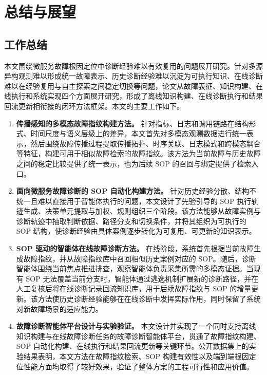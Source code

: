 
\chapter{总结与展望}

\section{工作总结}

本文围绕微服务故障根因定位中诊断经验难以有效复用的问题展开研究。针对多源异构观测难以形成统一故障表示、历史诊断经验难以沉淀为可执行知识、在线诊断难以在经验复用与自主探索之间稳定切换等问题，论文从故障表征、知识构建、在线执行和系统实现四个方面展开研究，形成了离线知识构建、在线诊断执行和结果回流更新相衔接的闭环方法框架。本文的主要工作如下。

\begin{enumerate}[label=（\arabic*）]
    \item \textbf{传播感知的多模态故障指纹构建方法。}
    针对指标、日志和调用链路在结构形式、时间尺度与语义层级上的差异，本文首先对多模态观测数据进行统一表示，然后围绕故障传播过程提取传播拓扑、时序关联、日志模式和跨模态耦合等特征，构建可用于相似故障检索的故障指纹。该方法为当前故障与历史故障之间的稳定比较提供了统一表示，也为后续 SOP 的召回与绑定提供了检索入口。

    \item \textbf{面向微服务故障诊断的 SOP 自动化构建方法。}
    针对历史经验分散、结构不统一且难以直接用于智能体执行的问题，本文设计了先验引导的 SOP 执行轨迹生成、决策单元提取与加权、规则组织三个阶段。该方法能够从故障实例与诊断轨迹中抽取判断依据、路径分支和切换条件，并将其组织为可执行的 SOP 结构，使诊断经验由具体案例逐步转化为可复用、可更新的知识表示。

    \item \textbf{SOP 驱动的智能体在线故障诊断方法。}
    在线阶段，系统首先根据当前故障生成故障指纹，并从故障指纹库中召回相似历史案例对应的 SOP。随后，诊断智能体围绕当前焦点推进排查，观察智能体负责采集所需的多模态证据。当现有 SOP 无法覆盖当前分支时，智能体通过逃逸机制扩展新的诊断路径，并在人工复核后将在线诊断记录回流知识库，用于后续故障指纹与 SOP 的增量更新。该方法使历史诊断经验能够在在线诊断中发挥实际作用，同时保留了系统对新故障场景的适应能力。

    \item \textbf{故障诊断智能体平台设计与实验验证。}
    本文设计并实现了一个同时支持离线知识构建与在线故障诊断任务的故障诊断智能体平台，贯通了故障指纹构建、SOP 自动化构建、在线执行和结果回流更新等关键环节。公开数据集上的实验结果表明，本文方法在故障指纹检索、SOP 构建有效性以及端到端根因定位性能方面均取得了较好效果，验证了整体方案的工程可行性和应用价值。
\end{enumerate}


